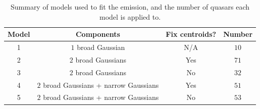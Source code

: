 \begin{table}
  \centering
  \footnotesize 
  \caption{Summary of models used to fit the \ha emission, and the number of quasars each model is applied to.}
  \label{tab:hamod}
    \begin{tabular}{cccc} 
    \hline
    Model     & Components & Fix centroids? & Number \\
    \hline
    1        & $1$ broad Gaussian  & N/A &  $10$ \\
    2        & $2$ broad Gaussians & Yes &  $71$ \\
    3        & $2$ broad Gaussians & No  &  $32$ \\
    4        & $2$ broad Gaussians + narrow Gaussians & Yes & $51$ \\
    5        & $2$ broad Gaussians + narrow Gaussians & No  & $53$ \\
    \hline
    \end{tabular}
\end{table} 

